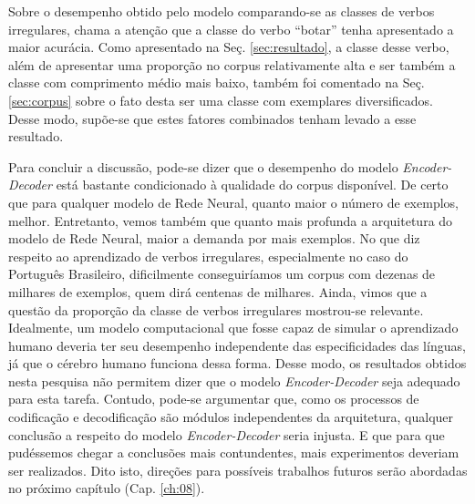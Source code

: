 Sobre o desempenho obtido pelo modelo comparando-se as classes de verbos irregulares, chama a atenção que a classe do verbo “botar” tenha apresentado a maior acurácia. Como apresentado na Seç. \ref{sec:resultado}, a classe desse verbo, além de apresentar uma proporção no corpus relativamente alta e ser também a classe com comprimento médio mais baixo, também foi comentado na Seç.\ref{sec:corpus} sobre o fato desta ser uma classe com exemplares diversificados. Desse modo, supõe-se que estes fatores combinados tenham levado a esse resultado. 

Para concluir a discussão, pode-se dizer que o desempenho do modelo \textit{Encoder-Decoder} está bastante condicionado à qualidade do corpus disponível. De certo que para qualquer modelo de Rede Neural, quanto maior o número de exemplos, melhor. Entretanto, vemos também que quanto mais profunda a arquitetura do modelo de Rede Neural, maior a demanda por mais exemplos. No que diz respeito ao aprendizado de verbos irregulares, especialmente no caso do Português Brasileiro, dificilmente conseguiríamos um corpus com dezenas de milhares de exemplos, quem dirá centenas de milhares. Ainda, vimos que a questão da proporção da classe de verbos irregulares mostrou-se relevante. Idealmente, um modelo computacional que fosse capaz de simular o aprendizado humano deveria ter seu desempenho independente das especificidades das línguas, já que o cérebro humano funciona dessa forma. Desse modo, os resultados obtidos nesta pesquisa não permitem dizer que o modelo \textit{Encoder-Decoder} seja adequado para esta tarefa. Contudo, pode-se argumentar que, como os processos de codificação e decodificação são módulos independentes da arquitetura, qualquer conclusão a respeito do modelo \textit{Encoder-Decoder} seria injusta. E que para que pudéssemos chegar a conclusões mais contundentes, mais experimentos deveriam ser realizados. Dito isto, direções para possíveis trabalhos futuros serão abordadas no próximo capítulo (Cap. \ref{ch:08}). 

  